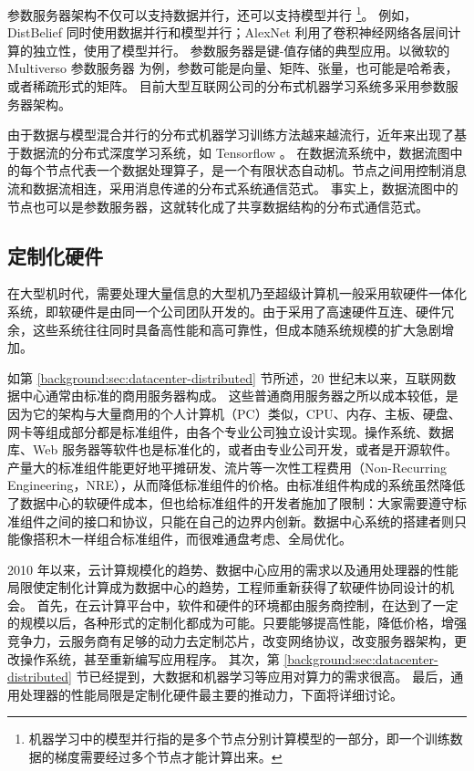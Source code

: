 参数服务器架构不仅可以支持数据并行，还可以支持模型并行 \footnote{机器学习中的模型并行指的是多个节点分别计算模型的一部分，即一个训练数据的梯度需要经过多个节点才能计算出来。}。
例如，DistBelief \cite{dean2012large} 同时使用数据并行和模型并行；AlexNet \cite{krizhevsky2012imagenet} 利用了卷积神经网络各层间计算的独立性，使用了模型并行。
参数服务器是键-值存储的典型应用。以微软的 Multiverso 参数服务器 \cite{multiverso} 为例，参数可能是向量、矩阵、张量，也可能是哈希表，或者稀疏形式的矩阵。
目前大型互联网公司的分布式机器学习系统多采用参数服务器架构。

由于数据与模型混合并行的分布式机器学习训练方法越来越流行，近年来出现了基于数据流的分布式深度学习系统，如 Tensorflow \cite{abadi2016tensorflow}。
在数据流系统中，数据流图中的每个节点代表一个数据处理算子，是一个有限状态自动机。节点之间用控制消息流和数据流相连，采用消息传递的分布式系统通信范式。
事实上，数据流图中的节点也可以是参数服务器，这就转化成了共享数据结构的分布式通信范式。






\subsection{定制化硬件}
\label{background:sec:datacenter-customized}


在大型机时代，需要处理大量信息的大型机乃至超级计算机一般采用软硬件一体化系统，即软硬件是由同一个公司团队开发的。由于采用了高速硬件互连、硬件冗余，这些系统往往同时具备高性能和高可靠性，但成本随系统规模的扩大急剧增加。

如第 \ref{background:sec:datacenter-distributed} 节所述，20 世纪末以来，互联网数据中心通常由标准的商用服务器构成。
这些普通商用服务器之所以成本较低，是因为它的架构与大量商用的个人计算机（PC）类似，CPU、内存、主板、硬盘、网卡等组成部分都是标准组件，由各个专业公司独立设计实现。操作系统、数据库、Web 服务器等软件也是标准化的，或者由专业公司开发，或者是开源软件。产量大的标准组件能更好地平摊研发、流片等一次性工程费用（Non-Recurring Engineering，NRE），从而降低标准组件的价格。由标准组件构成的系统虽然降低了数据中心的软硬件成本，但也给标准组件的开发者施加了限制：大家需要遵守标准组件之间的接口和协议，只能在自己的边界内创新。数据中心系统的搭建者则只能像搭积木一样组合标准组件，而很难通盘考虑、全局优化。

2010 年以来，云计算规模化的趋势、数据中心应用的需求以及通用处理器的性能局限使定制化计算成为数据中心的趋势，工程师重新获得了软硬件协同设计的机会。
首先，在云计算平台中，软件和硬件的环境都由服务商控制，在达到了一定的规模以后，各种形式的定制化都成为可能。只要能够提高性能，降低价格，增强竞争力，云服务商有足够的动力去定制芯片，改变网络协议，改变服务器架构，更改操作系统，甚至重新编写应用程序。
其次，第 \ref{background:sec:datacenter-distributed} 节已经提到，大数据和机器学习等应用对算力的需求很高。
最后，通用处理器的性能局限是定制化硬件最主要的推动力，下面将详细讨论。

